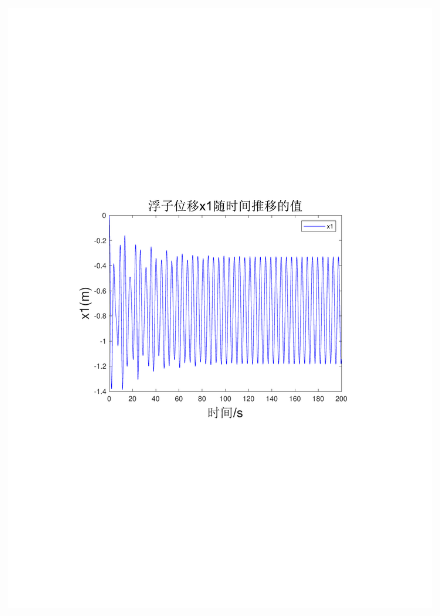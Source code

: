 \documentclass[12pt,utf8]{article}
\begin{document}
\begin{figure}[htbp]
	\centering
	\begin{minipage}{0.45\linewidth}
		\includegraphics[width=0.9\linewidth]{figures/T1-2浮子位移x1.pdf}
		\label{chutian1}%
	\end{minipage}
	\begin{minipage}{0.45\linewidth}

\end{minipage}
\end{figure}
\end{document}

